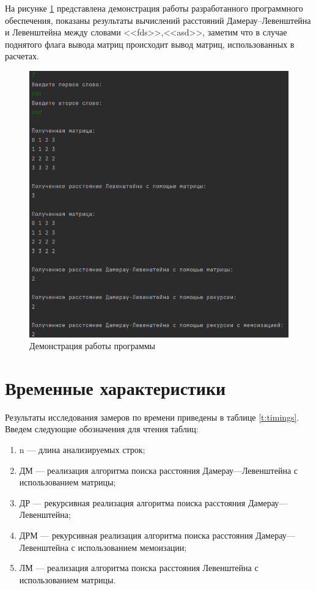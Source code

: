На рисунке \ref{img:demonstration} представлена демонстрация работы разработанного программного обеспечения, 
показаны результаты вычислений расстояний Дамерау--Левенштейна и Левенштейна между словами <<fds>>,<<asd>>, заметим
что в случае поднятого флага вывода матриц происходит вывод матриц, использованных в расчетах.
\clearpage
\begin{figure}[H]
	\centering
	\includegraphics[height=0.7\textheight]{../img/programm_work.png}
	\caption{Демонстрация работы программы}
	\label{img:demonstration}
\end{figure}

\clearpage

\section{Временные характеристики}

Результаты исследования замеров по времени приведены в таблице \ref{t:timings}.
Введем следующие обозначения для чтения таблиц:
\begin{enumerate}
	\item n --- длина анализируемых строк;
	\item ДМ --- реализация алгоритма поиска расстояния Дамерау---Левенштейна с использованием матрицы;
	\item ДР --- рекурсивная реализация алгоритма поиска расстояния Дамерау---Левенштейна;
	\item ДРМ ---  рекурсивная реализация алгоритма поиска расстояния Дамерау---Левенштейна с использованием мемоизации;
	\item ЛМ --- реализация алгоритма поиска расстояния Левенштейна с использованием матрицы.
\end{enumerate}


